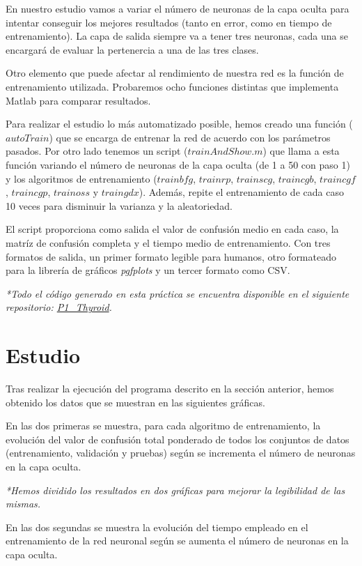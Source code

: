 \documentclass[a4paper,12pt,titlepage]{article}
\begin{document}
En nuestro estudio vamos a variar el número de neuronas de la capa oculta para intentar conseguir los mejores resultados (tanto en error, como en tiempo de entrenamiento). La capa de salida siempre va a tener tres neuronas, cada una se encargará de evaluar la pertenercia a una de las tres clases.

Otro elemento que puede afectar al rendimiento de nuestra red es la función de entrenamiento utilizada. Probaremos ocho funciones distintas que implementa Matlab para comparar resultados.

Para realizar el estudio lo más automatizado posible, hemos creado una función ($autoTrain$) que se encarga de entrenar la red de acuerdo con los parámetros pasados. Por otro lado tenemos un script ($trainAndShow.m$) que llama a esta función variando el número de neuronas de la capa oculta (de 1 a 50 con paso 1) y los algoritmos de entrenamiento ($trainbfg$, $trainrp$, $trainscg$, $traincgb$,  $traincgf$, $traincgp$, $trainoss$ y $traingdx$). Además, repite el entrenamiento de cada caso 10 veces para disminuir la varianza y la aleatoriedad.

El script proporciona como salida el valor de confusión medio en cada caso,  la matríz de confusión completa y el tiempo medio de entrenamiento. Con tres formatos de salida, un primer formato legible para humanos, otro formateado para la librería de gráficos \textit{pgfplots} y un tercer formato como CSV.

\emph{*Todo el código generado en esta práctica se encuentra disponible en el siguiente repositorio: 
\href{https://github.com/davidmigloz/neuronal-networks/tree/master/P1\_Thyroid}{P1\_Thyroid}.}

\section{Estudio}

Tras realizar la ejecución del programa descrito en la sección anterior, hemos obtenido los datos que se muestran en las siguientes gráficas.

En las dos primeras se muestra, para cada algoritmo de entrenamiento, la evolución del valor de confusión total ponderado de todos los conjuntos de datos (entrenamiento, validación y pruebas) según se incrementa el número de neuronas en la capa oculta. 

\textit{*Hemos dividido los resultados en dos gráficas para mejorar la legibilidad de las mismas.}

En las dos segundas se muestra la evolución del tiempo empleado en el entrenamiento de la red neuronal según se aumenta el número de neuronas en la capa oculta.
\end{document}
